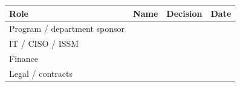 
{\small
\begin{tabularx}{\textwidth}{@{}Y{1.455}Y{0.97}Y{0.97}Y{0.605}@{}}
  \toprule
  Role & Name & Decision & Date \\
  \midrule
  Program / department sponsor & & & \\[10pt]
  IT / CISO / ISSM & & & \\[10pt]
  Finance & & & \\[10pt]
  Legal / contracts & & & \\[10pt]
  \bottomrule
\end{tabularx}}
